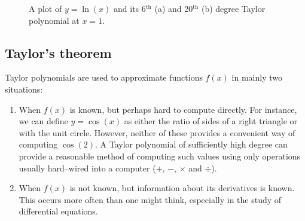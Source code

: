 \begin{example}
\begin{figure}[H]
\centering
\qquad
{}
\caption{A plot of $y=\ln(x)$ and its 6$^\text{th}$ (a) and  20$^\text{th}$ (b) degree Taylor polynomial at $x=1$.}
\end{figure}


\end{example}


\subsection{Taylor's theorem}

Taylor polynomials are used to approximate functions $f(x)$ in mainly two situations:
	\begin{enumerate}
	\item		When $f(x)$ is known, but perhaps hard to compute directly. For instance, we can define $y=\cos (x)$ as either the ratio of sides of a right triangle or with the unit circle. However, neither of these provides a convenient way of computing $\cos (2)$. A Taylor polynomial of sufficiently high degree can provide a reasonable method of computing such values using only operations usually hard--wired into a computer ($+$, $-$, $\times$ and $\div$).
	
	\item		When $f(x)$ is not known, but information about its derivatives is known. This occurs more often than one might think, especially in the study of differential equations.
	\end{enumerate}
	
